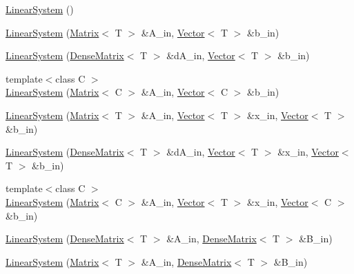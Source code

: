 \begin{DoxyCompactItemize}
\item 
\hyperlink{classlmx_1_1LinearSystem_a5e7b2e6cdf654b6e9160dae6e8a47411}{Linear\-System} ()
\item 
\hyperlink{classlmx_1_1LinearSystem_a8bdd7a369c8c801206f460b26415ed72}{Linear\-System} (\hyperlink{classlmx_1_1Matrix}{Matrix}$<$ T $>$ \&A\-\_\-in, \hyperlink{classlmx_1_1Vector}{Vector}$<$ T $>$ \&b\-\_\-in)
\item 
\hyperlink{classlmx_1_1LinearSystem_aefa5b0581d155110f1384c7796cee5cd}{Linear\-System} (\hyperlink{classlmx_1_1DenseMatrix}{Dense\-Matrix}$<$ T $>$ \&d\-A\-\_\-in, \hyperlink{classlmx_1_1Vector}{Vector}$<$ T $>$ \&b\-\_\-in)
\item 
{\footnotesize template$<$class C $>$ }\\\hyperlink{classlmx_1_1LinearSystem_abf1a07c09036c2cd79bd928a2c25f846}{Linear\-System} (\hyperlink{classlmx_1_1Matrix}{Matrix}$<$ C $>$ \&A\-\_\-in, \hyperlink{classlmx_1_1Vector}{Vector}$<$ C $>$ \&b\-\_\-in)
\item 
\hyperlink{classlmx_1_1LinearSystem_a4310900a6c137082a96a0831737413c6}{Linear\-System} (\hyperlink{classlmx_1_1Matrix}{Matrix}$<$ T $>$ \&A\-\_\-in, \hyperlink{classlmx_1_1Vector}{Vector}$<$ T $>$ \&x\-\_\-in, \hyperlink{classlmx_1_1Vector}{Vector}$<$ T $>$ \&b\-\_\-in)
\item 
\hyperlink{classlmx_1_1LinearSystem_a4ad2a58b543987e1fb285a40b15f832c}{Linear\-System} (\hyperlink{classlmx_1_1DenseMatrix}{Dense\-Matrix}$<$ T $>$ \&d\-A\-\_\-in, \hyperlink{classlmx_1_1Vector}{Vector}$<$ T $>$ \&x\-\_\-in, \hyperlink{classlmx_1_1Vector}{Vector}$<$ T $>$ \&b\-\_\-in)
\item 
{\footnotesize template$<$class C $>$ }\\\hyperlink{classlmx_1_1LinearSystem_a4873177fb073ea88d24a72f02d2e9813}{Linear\-System} (\hyperlink{classlmx_1_1Matrix}{Matrix}$<$ C $>$ \&A\-\_\-in, \hyperlink{classlmx_1_1Vector}{Vector}$<$ T $>$ \&x\-\_\-in, \hyperlink{classlmx_1_1Vector}{Vector}$<$ C $>$ \&b\-\_\-in)
\item 
\hyperlink{classlmx_1_1LinearSystem_a73933e500a798a1d6321125117d2fb74}{Linear\-System} (\hyperlink{classlmx_1_1DenseMatrix}{Dense\-Matrix}$<$ T $>$ \&A\-\_\-in, \hyperlink{classlmx_1_1DenseMatrix}{Dense\-Matrix}$<$ T $>$ \&B\-\_\-in)
\item 
\hyperlink{classlmx_1_1LinearSystem_a7e87de91b985ec7cf0bf19154b087d13}{Linear\-System} (\hyperlink{classlmx_1_1Matrix}{Matrix}$<$ T $>$ \&A\-\_\-in, \hyperlink{classlmx_1_1DenseMatrix}{Dense\-Matrix}$<$ T $>$ \&B\-\_\-in)

\end{DoxyCompactItemize}
